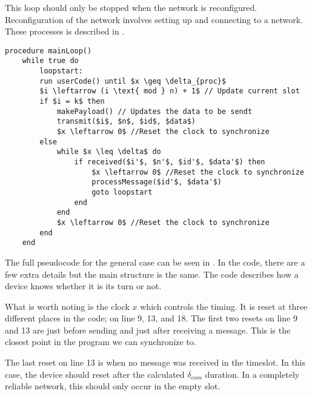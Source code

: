 
This loop should only be stopped when the network is reconfigured. 
Reconfiguration of the network involves setting up and connecting to a network. 
These processes is described in .

\begin{minipage}{\linewidth} %
\begin{lstlisting}[style=pseudocode,mathescape=true, label={lst:general_case}, caption={Pseudocode example of the main loop}] 
procedure mainLoop()
    while true do
        loopstart:
        run userCode() until $x \geq \delta_{proc}$
        $i \leftarrow (i \text{ mod } n) + 1$ // Update current slot
        if $i = k$ then
            makePayload() // Updates the data to be sendt
            transmit($i$, $n$, $id$, $data$)
            $x \leftarrow 0$ //Reset the clock to synchronize
        else
            while $x \leq \delta$ do
                if received($i'$, $n'$, $id'$, $data'$) then
                    $x \leftarrow 0$ //Reset the clock to synchronize
                    processMessage($id'$, $data'$)
                    goto loopstart
                end
            end
            $x \leftarrow 0$ //Reset the clock to synchronize
        end
    end
\end{lstlisting}  
\end{minipage}

The full pseudocode for the general case can be seen in . 
In the code, there are a few extra details but the main structure is the same. 
The code describes how a device knows whether it is its turn or not. 

What is worth noting is the clock $x$ which controls the timing. 
It is reset at three different places in the code; on line 9, 13, and 18. 
The first two resets on line 9 and 13 are just before sending and just after receiving a message. 
This is the closest point in the program we can synchronize to. 

The last reset on line 13 is when no message was received in the timeslot. 
In this case, the device should reset after the calculated $\delta_{com}$ duration. 
In a completely reliable network, this should only occur in the empty slot.

            